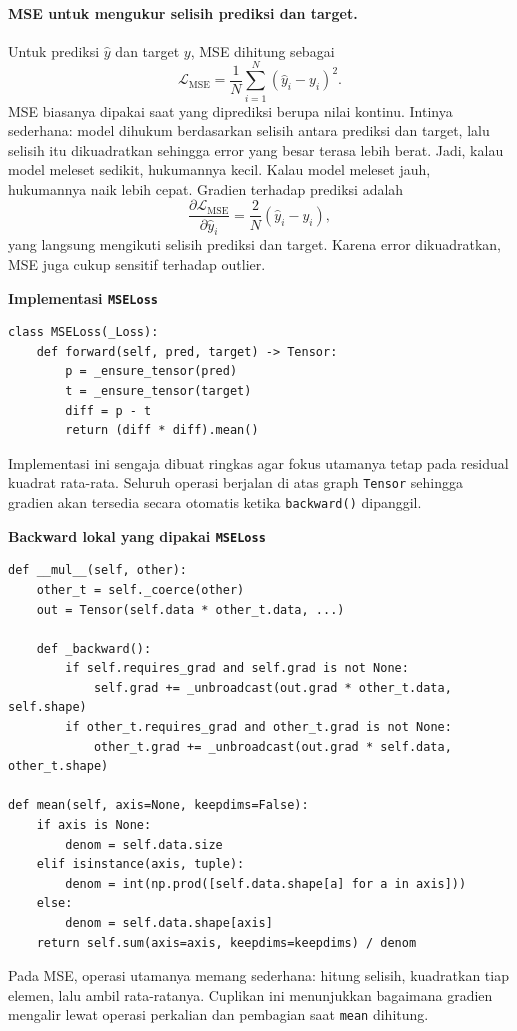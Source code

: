 \documentclass{article}
\begin{document}
\paragraph{MSE untuk mengukur selisih prediksi dan target.}
Untuk prediksi $\hat{y}$ dan target $y$, MSE dihitung sebagai
\begin{equation}
\mathcal{L}_{\mathrm{MSE}} = \frac{1}{N}\sum_{i=1}^N (\hat{y}_i-y_i)^2.
\end{equation}
MSE biasanya dipakai saat yang diprediksi berupa nilai kontinu. Intinya sederhana: model dihukum berdasarkan selisih antara prediksi dan target, lalu selisih itu dikuadratkan sehingga error yang besar terasa lebih berat. Jadi, kalau model meleset sedikit, hukumannya kecil. Kalau model meleset jauh, hukumannya naik lebih cepat. Gradien terhadap prediksi adalah
\begin{equation}
\frac{\partial \mathcal{L}_{\mathrm{MSE}}}{\partial \hat{y}_i}
=
\frac{2}{N}(\hat{y}_i-y_i),
\end{equation}
yang langsung mengikuti selisih prediksi dan target. Karena error dikuadratkan, MSE juga cukup sensitif terhadap outlier.

\noindent\textbf{Implementasi \texttt{MSELoss}}\par
\begin{lstlisting}
class MSELoss(_Loss):
    def forward(self, pred, target) -> Tensor:
        p = _ensure_tensor(pred)
        t = _ensure_tensor(target)
        diff = p - t
        return (diff * diff).mean()
\end{lstlisting}
Implementasi ini sengaja dibuat ringkas agar fokus utamanya tetap pada residual kuadrat rata-rata. Seluruh operasi berjalan di atas graph \texttt{Tensor} sehingga gradien akan tersedia secara otomatis ketika \texttt{backward()} dipanggil.

\noindent\textbf{Backward lokal yang dipakai \texttt{MSELoss}}\par
\begin{lstlisting}
def __mul__(self, other):
    other_t = self._coerce(other)
    out = Tensor(self.data * other_t.data, ...)

    def _backward():
        if self.requires_grad and self.grad is not None:
            self.grad += _unbroadcast(out.grad * other_t.data, self.shape)
        if other_t.requires_grad and other_t.grad is not None:
            other_t.grad += _unbroadcast(out.grad * self.data, other_t.shape)

def mean(self, axis=None, keepdims=False):
    if axis is None:
        denom = self.data.size
    elif isinstance(axis, tuple):
        denom = int(np.prod([self.data.shape[a] for a in axis]))
    else:
        denom = self.data.shape[axis]
    return self.sum(axis=axis, keepdims=keepdims) / denom
\end{lstlisting}
Pada MSE, operasi utamanya memang sederhana: hitung selisih, kuadratkan tiap elemen, lalu ambil rata-ratanya. Cuplikan ini menunjukkan bagaimana gradien mengalir lewat operasi perkalian dan pembagian saat \texttt{mean} dihitung.
\end{document}
